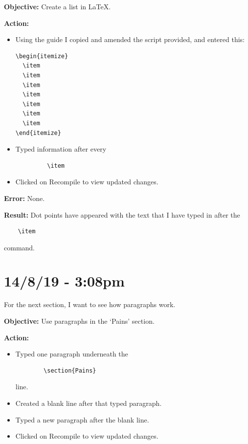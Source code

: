 \documentclass{article}
\begin{document}
\textbf{Objective:} Create a list in LaTeX.

\textbf{Action:}
\begin{itemize}
    \item Using the guide I copied and amended the script provided, and entered this:
    \begin{verbatim}
\begin{itemize}
  \item 
  \item 
  \item 
  \item 
  \item 
  \item 
  \item 
\end{itemize}
    \end{verbatim}
    \item Typed information after every \begin{verbatim}
         \item
    \end{verbatim}
    \item Clicked on Recompile to view updated changes.
\end{itemize}

\textbf{Error:} None.

\textbf{Result:} Dot points have appeared with the text that I have typed in after the \begin{verbatim}
    \item
\end{verbatim}
command.

\section*{14/8/19 - 3:08pm}

For the next section, I want to see how paragraphs work.

\textbf{Objective:} Use paragraphs in the ‘Pains’ section.

\textbf{Action:}
\begin{itemize}
    \item Typed one paragraph underneath the \begin{verbatim}
        \section{Pains}
    \end{verbatim} line.
    \item Created a blank line after that typed paragraph.
    \item Typed a new paragraph after the blank line.
    \item Clicked on Recompile to view updated changes.
\end{itemize}
\end{document}
